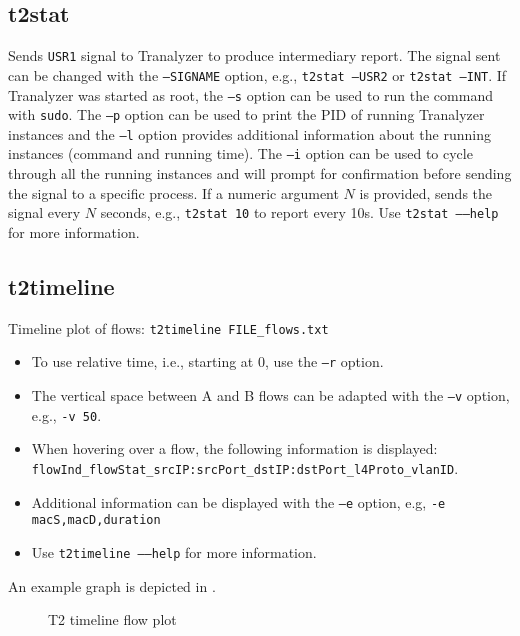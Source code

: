 \documentclass[documentation]{subfiles}
\begin{document}
\subsection{t2stat}\label{t2stat}
Sends {\tt USR1} signal to Tranalyzer to produce intermediary report.
The signal sent can be changed with the {\tt --SIGNAME} option, e.g., {\tt t2stat --USR2} or {\tt t2stat --INT}.
If Tranalyzer was started as root, the {\tt --s} option can be used to run the command with {\tt sudo}.
The {\tt --p} option can be used to print the PID of running Tranalyzer instances and the {\tt --l} option provides additional information about the running instances (command and running time).
The {\tt --i} option can be used to cycle through all the running instances and will prompt for confirmation before sending the signal to a specific process.
If a numeric argument $N$ is provided, sends the signal every $N$ seconds, e.g., {\tt t2stat 10} to report every 10s.
Use {\tt t2stat --{}--help} for more information.

\subsection{t2timeline}\label{t2timeline}
Timeline plot of flows: {\tt t2timeline FILE\_flows.txt}

\begin{itemize}
    \item To use relative time, i.e., starting at 0, use the {\tt --r} option.
    \item The vertical space between A and B flows can be adapted with the {\tt --v} option, e.g., {\tt -v 50}.
    \item When hovering over a flow, the following information is displayed:\\
          {\tt flowInd\_flowStat\_srcIP:srcPort\_dstIP:dstPort\_l4Proto\_vlanID}.
    \item Additional information can be displayed with the {\tt --e} option, e.g, {\tt -e macS,macD,duration}
    \item Use {\tt t2timeline --{}--help} for more information.
\end{itemize}

\noindent An example graph is depicted in .

\begin{figure}[!ht]
    \centering
    \caption{T2 timeline flow plot}
    \label{fig:t2timeline}
\end{figure}
\end{document}
